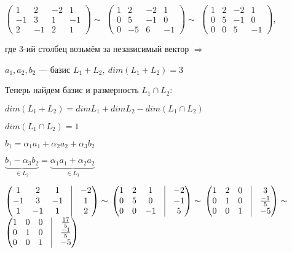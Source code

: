 \documentclass[a4paper, 12pt]{report}
\begin{document}
	$\begin{pmatrix} 1 & 2 & -2 & 1 \\ -1 & 3 & 1 & -1 \\ 2 & -1 & 2 & 1 \end{pmatrix} \sim $
	$\begin{pmatrix} 1 & 2 & -2 & 1 \\ 0 & 5 & -1 & 0 \\ 0 & -5 & 6 & -1 \end{pmatrix} \sim $
	$\begin{pmatrix} 1 & 2 & -2 & 1 \\ 0 & 5 & -1 & 0 \\ 0 & 0 & 5 & -1 \end{pmatrix}$, 
	\par\bigskip
	где 3-ий столбец возьмём за независимый вектор $\Rightarrow$ 
	
	$a_1, a_2, b_2$ --- базис $L_1+L_2,\  dim(L_1 + L_2) = 3$
	
	Теперь найдем базис и размерность $L_1 \cap L_2$:
	
	$dim(L_1 + L_2) = dim L_1 + dim L_2 - dim(L_1\cap L_2)$
	
	$dim(L_1\cap L_2) = 1$
	
	$b_1 = \alpha_1 a_1 + \alpha_2 a_2 + \alpha_3 b_2$
	
	$\underbrace{b_1 - \alpha_3 b_2}_{\in L_2} = 
	\underbrace{\alpha_1 a_1 + \alpha_2 a_2}_{\in L_1}$
	\par\bigskip
	$\begin{pmatrix} 1 & 2 & 1 & \vrule & -2 \\ -1 & 3 & -1 & \vrule & 1 \\ 1 & -1 & 1 &\vrule & 2 \end{pmatrix} \sim $
	$\begin{pmatrix} 1 & 2 & 1 & \vrule & -2 \\ 0 & 5 & 0 & \vrule & -1 \\ 0 & 0 & -1 &\vrule & 5 \end{pmatrix} \sim $
	$\begin{pmatrix} 1 & 2 & 0 & \vrule & 3 \\ 0 & 1 & 0 & \vrule & \frac{-1}{5} \\ 0 & 0 & 1 &\vrule & -5 \end{pmatrix} \sim $
	$\begin{pmatrix} 1 & 0 & 0 & \vrule & \frac{17}{5} \\ 0 & 1 & 0 & \vrule & \frac{-1}{5} \\ 0 & 0 & 1 &\vrule & -5 \end{pmatrix} $
	\par\bigskip
	
\end{document}
